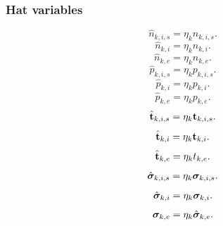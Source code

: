 \documentclass[a4paper,11pt]{report}
\begin{document}
\subsubsection{Hat variables}

\begin{equation}
    \label{eq:sf_vars_def_hatn_kis}
    \hat{n}_{k,i,s} = \eta_k n_{k,i,s}.
\end{equation}
\begin{equation}
    \label{eq:sf_vars_def_hatn_ki}
    \hat{n}_{k,i} = \eta_k n_{k,i}.
\end{equation}
\begin{equation}
    \label{eq:sf_vars_def_hatn_ke}
    \hat{n}_{k,e} = \eta_k n_{k,e}.
\end{equation}
\begin{equation}
    \label{eq:sf_vars_def_hatp_kis}
    \hat{p}_{k,i,s} = \eta_k p_{k,i,s}.
\end{equation}
\begin{equation}
    \label{eq:sf_vars_def_hatp_ki}
    \hat{p}_{k,i} = \eta_k p_{k,i}.
\end{equation}
\begin{equation}
    \label{eq:sf_vars_def_hatp_ke}
    \hat{p}_{k,e} = \eta_k p_{k,e}.
\end{equation}
\begin{equation}
    \label{eq:sf_vars_def_hatt_kis}
    \hat{\mathbf{t}}_{k,i,s} = \eta_k \mathbf{t}_{k,i,s}.
\end{equation}
\begin{equation}
    \label{eq:sf_vars_def_hatt_ki}
    \hat{\mathbf{t}}_{k,i} = \eta_k \mathbf{t}_{k,i}.
\end{equation}
\begin{equation}
    \label{eq:sf_vars_def_hatt_ke}
    \hat{\mathbf{t}}_{k,e} = \eta_k t_{k,e}.
\end{equation}
\begin{equation}
    \label{eq:sf_vars_def_hatsigma_kis}
    \hat{\bm \sigma}_{k,i,s} = \eta_k \bm \sigma_{k,i,s}.
\end{equation}
\begin{equation}
    \label{eq:sf_vars_def_hatsigma_ki}
    \hat{\bm \sigma}_{k,i} = \eta_k \bm \sigma_{k,i}.
\end{equation}
\begin{equation}
    \label{eq:sf_vars_def_hatsigma_ke}
    \bm \sigma_{k,e} = \eta_k \hat{\bm \sigma}_{k,e}.
\end{equation}
\end{document}
